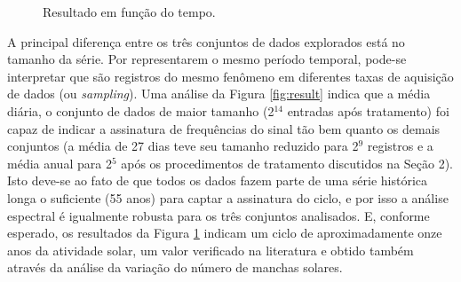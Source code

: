 \begin{figure}[ht!]
	\caption{Resultado em função do tempo.}
	\vspace{1mm}	%
	\begin{center}
	\end{center}
	\vspace{1mm}	%
	\label{fig:result_t}
\end{figure}

A principal diferença entre os três conjuntos de dados explorados está no tamanho da série. Por representarem o mesmo período temporal, pode-se interpretar que são registros do mesmo fenômeno em diferentes taxas de aquisição de dados (ou \textit{sampling}). Uma análise da Figura \ref{fig:result} indica que a média diária, o conjunto de dados de maior tamanho (2$^{14}$ entradas após tratamento) foi capaz de indicar a assinatura de frequências do sinal tão bem quanto os demais conjuntos (a média de 27 dias teve seu tamanho reduzido para 2$^{9}$ registros e a média anual para 2$^{5}$ após os procedimentos de tratamento discutidos na Seção 2). Isto deve-se ao fato de que todos os dados fazem parte de uma série histórica longa o suficiente (55 anos) para captar a assinatura do ciclo, e por isso a análise espectral é igualmente robusta para os três conjuntos analisados. E, conforme esperado, os resultados da Figura \ref{fig:result_t} indicam um ciclo de aproximadamente onze anos da atividade solar, um valor verificado na literatura e obtido também através da análise da variação do número de manchas solares. 

